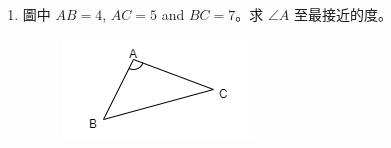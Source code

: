 \documentclass[11pt]{article}
\begin{document}
\begin{enumerate}
        \hrulefill
        
        \hrulefill
        
        \hrulefill
        
        \hrulefill
        
        \hrulefill
        
        \hrulefill

        \hrulefill

        \hrulefill
            
        \hrulefill
        
        \hrulefill
        
        \hrulefill
        
        \hrulefill
        
        \hrulefill
        
        \hrulefill
        
        \hrulefill
        
        \hrulefill
        
        \hrulefill
        
        \hrulefill
            
        \hrulefill
        
        \hrulefill
        
        \hrulefill
        
        \hrulefill
        
        \hrulefill
        
        \hrulefill
        
        \hrulefill
        
        \hrulefill
        
        \hrulefill
        
        \hrulefill

    \pagebreak
    \item 圖中 $AB=4$, $AC=5$ and $BC=7$。求 $\angle A$ 至最接近的度。\begin{figure}[H]
        \centering
        \includegraphics[scale=0.8]{f4finalq38.png}
    \end{figure}

    \hrulefill
        

\end{enumerate}
\end{document}
